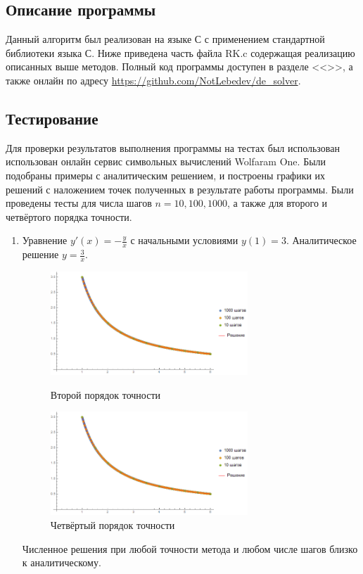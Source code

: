 \documentclass[a4paper,12pt,titlepage,finall]{article}
\begin{document}
\subsection{Описание программы}
Данный алгоритм был реализован на языке С с применением стандартной библиотеки языка С. Ниже приведена часть файла RK.c содержащая реализацию описанных выше методов. Полный код программы доступен в разделе <<>>, а также онлайн по адресу \url{https://github.com/NotLebedev/de_solver}.


\subsection{Тестирование}
Для проверки результатов выполнения программы на тестах был использован использован онлайн сервис символьных вычислений Wolfaram One. Были подобраны примеры с аналитическим решением, и построены графики их решений с наложением точек полученных в результате работы программы. Были проведены тесты для числа шагов $n = 10, 100, 1000$, а также для второго и четвёртого порядка точности.
\begin{enumerate}
\item
Уравнение $y'(x) = -\frac{y}{x}$ с начальными условиями $y(1)=3$. Аналитическое решение $y = \frac{3}{x}$.
\begin{figure}[h]
\centering
\includegraphics[width=0.7\textwidth]{test_1_1_2.png}
\caption{Второй порядок точности}
\centering
\includegraphics[width=0.7\textwidth]{test_1_1_4.png}
\caption{Четвёртый порядок точности}
\end{figure}
\par
Численное решения при любой точности метода и любом числе шагов близко к аналитическому.
\end{enumerate}
\end{document}
